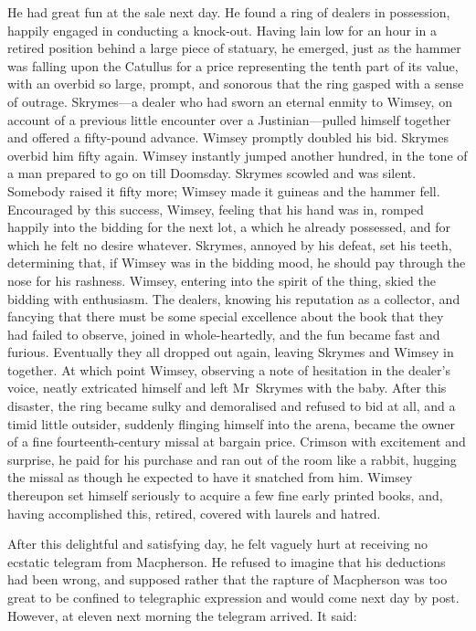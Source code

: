 He had great fun at the sale next day. He found a ring of dealers in possession, happily engaged in conducting a knock-out. Having lain low for an hour in a retired position behind a large piece of statuary, he emerged, just as the hammer was falling upon the Catullus for a price representing the tenth part of its value, with an overbid so large, prompt, and sonorous that the ring gasped with a sense of outrage. Skrymes—a dealer who had sworn an eternal enmity to Wimsey, on account of a previous little encounter over a Justinian—pulled himself together and offered a fifty-pound advance. Wimsey promptly doubled his bid. Skrymes overbid him fifty again. Wimsey instantly jumped another hundred, in the tone of a man prepared to go on till Doomsday. Skrymes scowled and was silent. Somebody raised it fifty more; Wimsey made it guineas and the hammer fell. Encouraged by this success, Wimsey, feeling that his hand was in, romped happily into the bidding for the next lot, a  which he already possessed, and for which he felt no desire whatever. Skrymes, annoyed by his defeat, set his teeth, determining that, if Wimsey was in the bidding mood, he should pay through the nose for his rashness. Wimsey, entering into the spirit of the thing, skied the bidding with enthusiasm. The dealers, knowing his reputation as a collector, and fancying that there must be some special excellence about the book that they had failed to observe, joined in whole-heartedly, and the fun became fast and furious. Eventually they all dropped out again, leaving Skrymes and Wimsey in together. At which point Wimsey, observing a note of hesitation in the dealer's voice, neatly extricated himself and left Mr~Skrymes with the baby. After this disaster, the ring became sulky and demoralised and refused to bid at all, and a timid little outsider, suddenly flinging himself into the arena, became the owner of a fine fourteenth-century missal at bargain price. Crimson with excitement and surprise, he paid for his purchase and ran out of the room like a rabbit, hugging the missal as though he expected to have it snatched from him. Wimsey thereupon set himself seriously to acquire a few fine early printed books, and, having accomplished this, retired, covered with laurels and hatred.

After this delightful and satisfying day, he felt vaguely hurt at receiving no ecstatic telegram from Macpherson. He refused to imagine that his deductions had been wrong, and supposed rather that the rapture of Macpherson was too great to be confined to telegraphic expression and would come next day by post. However, at eleven next morning the telegram arrived. It said:

